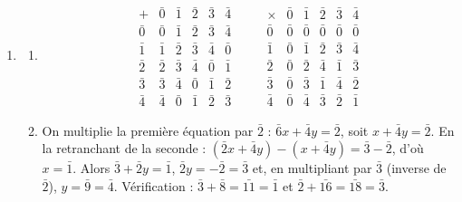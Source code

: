 \begin{description}
\begin{enumerate}
\begin{enumerate}
				$54 = 2 \times 27 + 0$, $27 = 2 \times 13 + 1$, $13 = 2 \times 6 + 1$, $6 = 2 \times 3 + 0$, $3 = 2 \times 1 + 1$, $1 = 2 \times 0 + 1$.
				On lit les restes de bas en haut : \par\noindent{} ($32 + 16 + 4 + 2 = 54$).
		\end{enumerate}
		\item
		\begin{enumerate}
			\item {}
				\[
				\begin{array}{c|ccccc}
					+ & \bar{0} & \bar{1} & \bar{2} & \bar{3} & \bar{4} \\ \hline
					\bar{0} & \bar{0} & \bar{1} & \bar{2} & \bar{3} & \bar{4} \\
					\bar{1} & \bar{1} & \bar{2} & \bar{3} & \bar{4} & \bar{0} \\
					\bar{2} & \bar{2} & \bar{3} & \bar{4} & \bar{0} & \bar{1} \\
					\bar{3} & \bar{3} & \bar{4} & \bar{0} & \bar{1} & \bar{2} \\
					\bar{4} & \bar{4} & \bar{0} & \bar{1} & \bar{2} & \bar{3}
				\end{array}
				\qquad
				\begin{array}{c|ccccc}
					\times & \bar{0} & \bar{1} & \bar{2} & \bar{3} & \bar{4} \\ \hline
					\bar{0} & \bar{0} & \bar{0} & \bar{0} & \bar{0} & \bar{0} \\
					\bar{1} & \bar{0} & \bar{1} & \bar{2} & \bar{3} & \bar{4} \\
					\bar{2} & \bar{0} & \bar{2} & \bar{4} & \bar{1} & \bar{3} \\
					\bar{3} & \bar{0} & \bar{3} & \bar{1} & \bar{4} & \bar{2} \\
					\bar{4} & \bar{0} & \bar{4} & \bar{3} & \bar{2} & \bar{1}
				\end{array}
				\]
			\item {}
				On multiplie la première équation par $\bar{2}$ : $\bar{6}x + \bar{4}y = \bar{2}$, soit $x + \bar{4}y = \bar{2}$.
				En la retranchant de la seconde : $(\bar{2}x + \bar{4}y) - (x + \bar{4}y) = \bar{3} - \bar{2}$, d'où $x = \bar{1}$.
				Alors $\bar{3} + \bar{2}y = \bar{1}$, $\bar{2}y = -\bar{2} = \bar{3}$ et, en multipliant par $\bar{3}$ (inverse de $\bar{2}$), $y = \bar{9} = \bar{4}$.
				Vérification : $\bar{3} + \bar{8} = \bar{11} = \bar{1}$ et $\bar{2} + \bar{16} = \bar{18} = \bar{3}$.
				\par\noindent{}

\end{enumerate}
\end{enumerate}
\end{description}
